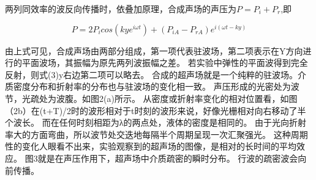 \documentclass[12pt,a4paper,UTF8]{ctexart}
\begin{document}
两列同效率的波反向传播时，依叠加原理，合成声场的声压为$P=P_i+P_r$,即

\begin{equation}
	P=2P_icos(kye^{i\omega t})+(P_{iA}-P_{rA})e^{i(\omega t-ky)}
\end{equation}

由上式可见，合成声场由两部分组成，第一项代表驻波场，第二项表示在Y方向进行的平面波场，其振幅为原先两列波振幅之差。
若实验中弹性的平面波得到完全反射，则式(3)y右边第二项可以略去。
合成的超声场就是一个纯粹的驻波场。介质密度分布和折射率的分布也与驻波场的变化相一致。
声压形成的光密处为波节，光疏处为波腹。如图2(a)所示。
从密度或折射率变化的相对位置看，如图（2b）在(t+T)/2时的波形相对于t时刻的波形来说，好像光栅相对向右移动了半个波长。
而在任何时刻相距为λ的两点处，液体的密度是相同的。
由于光向折射率大的方面弯曲，所以波节处交迭地每隔半个周期呈现一次汇聚强光。
这种周期性的变化人眼看不出来，实验观察到的超声场的图像，是相对的长时间的平均效应。
图3就是在声压作用下，超声场中介质疏密的瞬时分布。
行波的疏密波会向前传播。

\begin{figure}[htbp]
	\centering
	\caption{}
	\label{fig:tcvi}
\end{figure}
\end{document}
